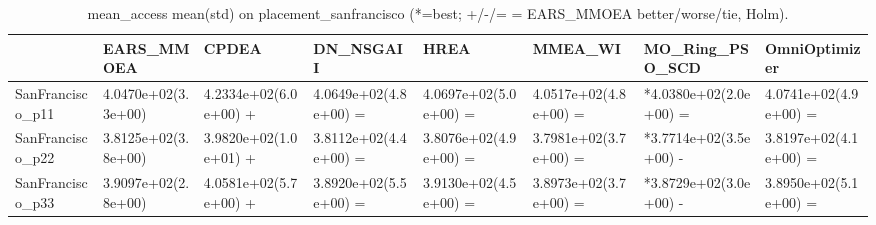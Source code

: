 \begin{table}[t]
\centering
\caption{mean_access mean(std) on placement_sanfrancisco (*=best; +/-/= = EARS_MMOEA better/worse/tie, Holm).}
\label{tab:placement_sanfrancisco_mean_access}
\begin{tabular}{llllllll}
\toprule
 & EARS\_MMOEA & CPDEA & DN\_NSGAII & HREA & MMEA\_WI & MO\_Ring\_PSO\_SCD & OmniOptimizer \\
\midrule
SanFrancisco\_p11 & 4.0470e+02(3.3e+00) & 4.2334e+02(6.0e+00) + & 4.0649e+02(4.8e+00) = & 4.0697e+02(5.0e+00) = & 4.0517e+02(4.8e+00) = & *4.0380e+02(2.0e+00) = & 4.0741e+02(4.9e+00) = \\
SanFrancisco\_p22 & 3.8125e+02(3.8e+00) & 3.9820e+02(1.0e+01) + & 3.8112e+02(4.4e+00) = & 3.8076e+02(4.9e+00) = & 3.7981e+02(3.7e+00) = & *3.7714e+02(3.5e+00) - & 3.8197e+02(4.1e+00) = \\
SanFrancisco\_p33 & 3.9097e+02(2.8e+00) & 4.0581e+02(5.7e+00) + & 3.8920e+02(5.5e+00) = & 3.9130e+02(4.5e+00) = & 3.8973e+02(3.7e+00) = & *3.8729e+02(3.0e+00) - & 3.8950e+02(5.1e+00) = \\
\bottomrule
\end{tabular}
\end{table}
